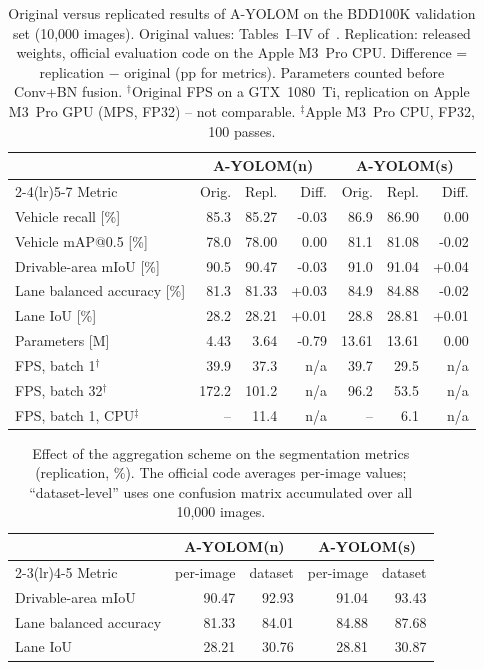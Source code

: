 \begin{table}[t]
\centering
\caption{Original versus replicated results of A-YOLOM on the BDD100K validation set (10{,}000 images). Original values: Tables~I--IV of~\cite{wang2024ayolom}. Replication: released weights, official evaluation code on the Apple M3~Pro CPU. Difference = replication $-$ original (pp for metrics). Parameters counted before Conv+BN fusion. $^\dagger$Original FPS on a GTX~1080~Ti, replication on Apple M3~Pro GPU (MPS, FP32) -- not comparable. $^\ddagger$Apple M3~Pro CPU, FP32, 100 passes.}
\label{tab:repl}
\small
\begin{tabular}{l rrr rrr}
\toprule
 & \multicolumn{3}{c}{A-YOLOM(n)} & \multicolumn{3}{c}{A-YOLOM(s)} \\
\cmidrule(lr){2-4}\cmidrule(lr){5-7}
Metric & Orig. & Repl. & Diff. & Orig. & Repl. & Diff. \\
\midrule
Vehicle recall [\%] & 85.3 & 85.27 & -0.03 & 86.9 & 86.90 & 0.00 \\
Vehicle mAP@0.5 [\%] & 78.0 & 78.00 & 0.00 & 81.1 & 81.08 & -0.02 \\
Drivable-area mIoU [\%] & 90.5 & 90.47 & -0.03 & 91.0 & 91.04 & +0.04 \\
Lane balanced accuracy [\%] & 81.3 & 81.33 & +0.03 & 84.9 & 84.88 & -0.02 \\
Lane IoU [\%] & 28.2 & 28.21 & +0.01 & 28.8 & 28.81 & +0.01 \\
\midrule
Parameters [M] & 4.43 & 3.64 & -0.79 & 13.61 & 13.61 & 0.00 \\
FPS, batch 1$^\dagger$ & 39.9 & 37.3 & n/a & 39.7 & 29.5 & n/a \\
FPS, batch 32$^\dagger$ & 172.2 & 101.2 & n/a & 96.2 & 53.5 & n/a \\
FPS, batch 1, CPU$^\ddagger$ & -- & 11.4 & n/a & -- & 6.1 & n/a \\
\bottomrule
\end{tabular}
\end{table}

\begin{table}[t]
\centering
\caption{Effect of the aggregation scheme on the segmentation metrics (replication, \%). The official code averages per-image values; ``dataset-level'' uses one confusion matrix accumulated over all 10{,}000 images.}
\label{tab:agg}
\small
\begin{tabular}{l rr rr}
\toprule
 & \multicolumn{2}{c}{A-YOLOM(n)} & \multicolumn{2}{c}{A-YOLOM(s)} \\
\cmidrule(lr){2-3}\cmidrule(lr){4-5}
Metric & per-image & dataset & per-image & dataset \\
\midrule
Drivable-area mIoU & 90.47 & 92.93 & 91.04 & 93.43 \\
Lane balanced accuracy & 81.33 & 84.01 & 84.88 & 87.68 \\
Lane IoU & 28.21 & 30.76 & 28.81 & 30.87 \\
\bottomrule
\end{tabular}
\end{table}

